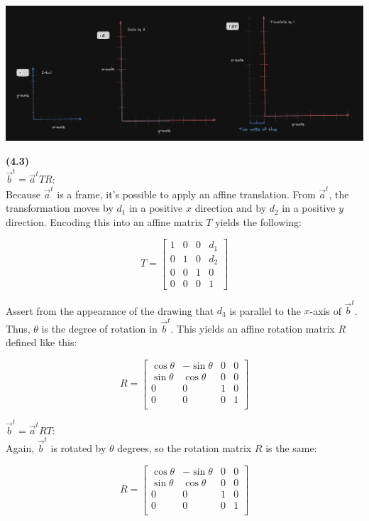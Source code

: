 \documentclass[letterpaper, 11pt]{article}
\begin{document}
\medskip
\noindent \includegraphics[scale=0.3]{./pics/q2.png}

\newpage
\noindent \textbf{(4.3)} \\
$\vec{b}^t = \vec{a}^t TR$: \\
Because $\vec{a}^t$ is a frame, it's possible to apply an affine translation. From $\vec{a}^t$, the transformation moves by $d_1$ in a positive $x$ direction and by $d_2$ in a positive $y$ direction. Encoding this into an affine matrix $T$ yields the following:

$$T = \begin{bmatrix}
  1 & 0 & 0 & d_1 \\
  0 & 1 & 0 & d_2 \\ 
  0 & 0 & 1 & 0 \\ 
  0 & 0 & 0 & 1
\end{bmatrix}$$

Assert from the appearance of the drawing that $d_3$ is parallel to the $x$-axis of $\vec{b}^t$. Thus, $\theta$ is the degree of rotation in $\vec{b}^t$. This yields an affine rotation matrix $R$ defined like this:

$$R = \begin{bmatrix}
  \cos \theta & - \sin \theta & 0 & 0 \\ 
  \sin \theta & \cos \theta & 0 & 0 \\ 
  0 & 0 & 1 & 0 \\ 
  0 & 0 & 0 & 1 \\
\end{bmatrix}$$

\medskip
\noindent $\vec{b}^t = \vec{a}^t RT$: \\
Again, $\vec{b}^t$ is rotated by $\theta$ degrees, so the rotation matrix $R$ is the same:

$$R = \begin{bmatrix}
  \cos \theta & - \sin \theta & 0 & 0 \\ 
  \sin \theta & \cos \theta & 0 & 0 \\ 
  0 & 0 & 1 & 0 \\ 
  0 & 0 & 0 & 1 \\
\end{bmatrix}$$
\end{document}
